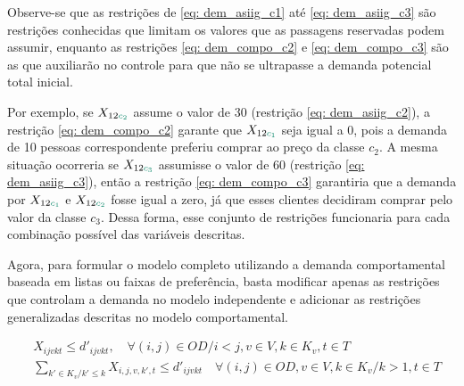 Observe-se que as restrições de \ref{eq: dem_asiig_c1} até \ref{eq: dem_asiig_c3} são restrições conhecidas que limitam os valores que as passagens reservadas podem assumir, enquanto as restrições \ref{eq: dem_compo_c2} e \ref{eq: dem_compo_c3} são as que auxiliarão no controle para que não se ultrapasse a demanda potencial total inicial.

Por exemplo, se $X_{12\textcolor[rgb]{0.0588, 0.5412, 0.4275}{c_2}}$ assume o valor de 30 (restrição \ref{eq: dem_asiig_c2}), a restrição \ref{eq: dem_compo_c2} garante que $X_{12\textcolor[rgb]{0.0588, 0.5412, 0.4275}{c_1}}$ seja igual a 0, pois a demanda de 10 pessoas correspondente preferiu comprar ao preço da classe $c_2$. A mesma situação ocorreria se $X_{12\textcolor[rgb]{0.0588, 0.5412, 0.4275}{c_3}}$ assumisse o valor de 60 (restrição \ref{eq: dem_asiig_c3}), então a restrição \ref{eq: dem_compo_c3} garantiria que a demanda por $X_{12\textcolor[rgb]{0.0588, 0.5412, 0.4275}{c_1}}$ e $X_{12\textcolor[rgb]{0.0588, 0.5412, 0.4275}{c_2}}$ fosse igual a zero, já que esses clientes decidiram comprar pelo valor da classe $c_3$. Dessa forma, esse conjunto de restrições funcionaria para cada combinação possível das variáveis descritas.











































Agora, para formular o modelo completo utilizando a demanda comportamental baseada em listas ou faixas de preferência, basta modificar apenas as restrições que controlam a demanda no modelo independente e adicionar as restrições generalizadas descritas no modelo comportamental.

\allowdisplaybreaks
\begin{align}
	 & X_{ijvkt} \leq d'_{ijvkt},  \quad \forall (i,j) \in OD / i < j  ,v \in V, k \in K_v, t\in T                                                                                                 \label{eq: m2_assig_menor_dem}                               \\
	 & \sum_{k' \in K_v / k' \leq k}X_{i,j,v,k',t} \leq d'_{ijvkt} \quad \forall (i,j) \in OD, v \in V, k \in K_v / k > 1, t\in T                                                                                    \label{eq: m2_dem_compor_acumulacao_class}
\end{align}

